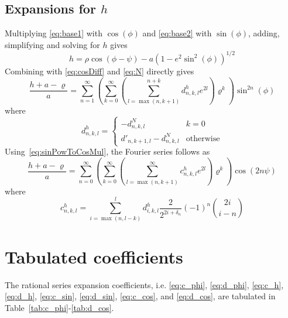 \documentclass[a4paper]{amsart}
\begin{document}
\subsection{Expansions for $h$}\label{app:h}
Multiplying \eqref{eq:base1} with $\cos(\phi)$ and \eqref{eq:base2} with $\sin(\phi)$, adding, simplifying and solving for $h$ gives 
\begin{equation*}
h=\rho\cos(\phi-\psi)-a(1-e^2\sin^2(\phi))^{1/2}
\end{equation*}
Combining with \eqref{eq:cosDiff} and \eqref{eq:N} directly gives
\begin{equation}
\frac{h + a - \varrho}{a} = \sum_{n=1}^\infty\left(\sum_{k=0}^\infty\left(\sum_{l=\max(n,k+1)}^{n+k} d^h_{n,k,l}e^{2l}\right)\varrho^k\right)\sin^{2n}(\phi)
\end{equation}
where
\begin{equation}
d^h_{n,k,l}=
\begin{cases}
-d^N_{n,k,l} & k=0 \\
d'_{n,k+1,l}-d^N_{n,k,l} & \text{otherwise}
\end{cases}\label{eq:d_h}
\end{equation}
Using~\eqref{eq:sinPowToCosMul}, the Fourier series follows as
\begin{equation}
\frac{h + a - \varrho}{a}=\sum_{n=0}^\infty\left( \sum_{k=0}^\infty\left(\sum_{l=\max(n,k+1)}^\infty c^h_{n,k,l}e^{2l}\right)\varrho^k\right)\cos(2n\psi)
\end{equation}
where
\begin{equation}
c^h_{n,k,l}=\sum_{i=\max(n,l-k)}^l d^h_{i,k,l}\frac{2}{2^{2i+\delta_n}}(-1)^{n}\binom{2i}{i-n}\label{eq:c_h}
\end{equation}


\section{Tabulated coefficients}\label{sec::tabulated_coefficients}
The rational series expansion coefficients, i.e. \eqref{eq:c_phi}, \eqref{eq:d_phi}, \eqref{eq:c_h}, \eqref{eq:d_h}, \eqref{eq:c_sin}, \eqref{eq:d_sin}, \eqref{eq:c_cos}, and \eqref{eq:d_cos}, are tabulated in Table~\ref{tab:c_phi}-\ref{tab:d_cos}. %









\end{document}
